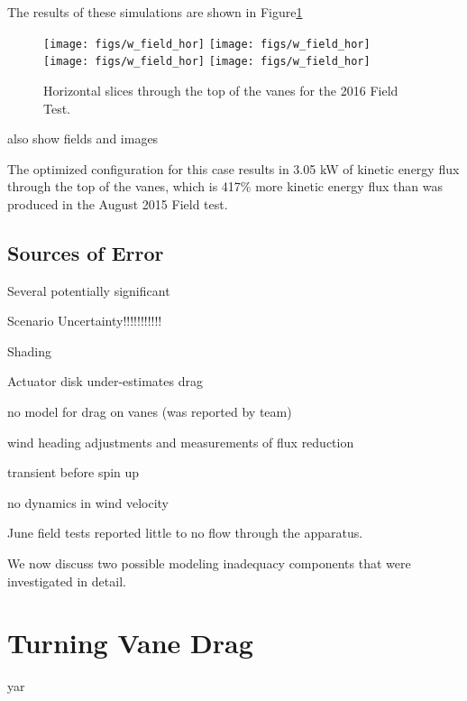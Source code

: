 The results of these simulations are shown in Figure\ref{}

\begin{figure}
  \centering
  \texttt{[image: figs/w\_field\_hor]}
  \hfill
  \texttt{[image: figs/w\_field\_hor]}
  \\
  \texttt{[image: figs/w\_field\_hor]}
  \hfill
  \texttt{[image: figs/w\_field\_hor]}
  \label{fig:field_hor}
 \caption{Horizontal slices through the top of the vanes for the
 2016 Field Test.} 
\end{figure}


also show fields and images

The optimized configuration for this case results in 3.05 kW of kinetic
energy flux through the top of the vanes, which is 417\% more kinetic
energy flux than was produced in the August 2015 Field test.

\subsection{Sources of Error}
\label{sec:field_error}
%

Several potentially significant 

Scenario Uncertainty!!!!!!!!!!!

Shading

Actuator disk under-estimates drag

no model for drag on vanes (was reported by team)

wind heading adjustments and measurements of flux reduction

transient before spin up

no dynamics in wind velocity

June field tests reported little to no flow through the apparatus. 

We now discuss two possible modeling inadequacy components that were
investigated in detail. 

\section{Turning Vane Drag}

yar

